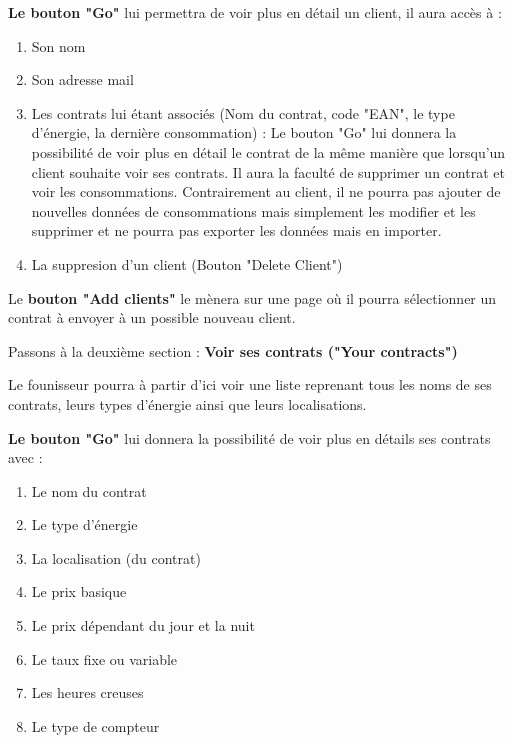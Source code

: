 \begin{flushleft}
\textbf{Le bouton "Go"} lui permettra de voir plus en détail un client, il aura accès à :
\end{flushleft}
\begin{enumerate}
\item Son nom
\item Son adresse mail
\item Les contrats lui étant associés (Nom du contrat, code "EAN", le type d'énergie, la dernière consommation) : \newline
Le bouton "Go" lui donnera la possibilité de voir plus en détail le contrat de la même manière que lorsqu'un client souhaite voir ses contrats.\newline
Il aura la faculté de supprimer un contrat et voir les consommations.\newline
Contrairement au client, il ne pourra pas ajouter de nouvelles données de consommations mais simplement les modifier et les supprimer et ne pourra pas exporter les données mais en importer.
\item La suppresion d'un client (Bouton "Delete Client")
\end{enumerate}

\begin{flushleft}
Le \textbf{bouton "Add clients"} le mènera sur une page où il pourra sélectionner un contrat à envoyer à un possible nouveau client.
\end{flushleft}

\newpage

\begin{flushleft}
Passons à la deuxième section : \textbf{Voir ses contrats ("Your contracts")}
\end{flushleft}

\begin{flushleft}
Le founisseur pourra à partir d'ici voir une liste reprenant tous les noms de ses contrats, leurs types d'énergie ainsi que leurs localisations. 
\end{flushleft}

\begin{flushleft}
\textbf{Le bouton "Go"} lui donnera la possibilité de voir plus en détails ses contrats avec :
\end{flushleft}
\begin{enumerate}
\item Le nom du contrat
\item Le type d'énergie
\item La localisation (du contrat)
\item Le prix basique
\item Le prix dépendant du jour et la nuit
\item Le taux fixe ou variable
\item Les heures creuses
\item Le type de compteur
\end{enumerate}

